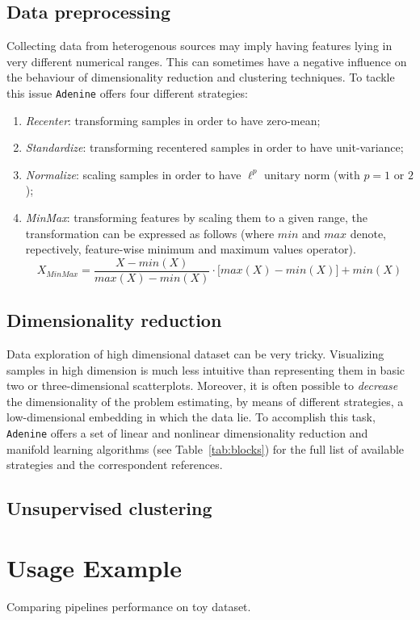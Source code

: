\documentclass[twoside,11pt]{article}
\makeatletter
\newcommand{\ade}{\texttt{Adenine}\@\xspace}
\makeatother
\begin{document}
\subsection*{Data preprocessing}
Collecting data from heterogenous sources may imply having features lying in very different numerical ranges. This can sometimes have a negative influence on the behaviour of dimensionality reduction and clustering techniques. To tackle this issue \ade offers four different strategies:
\begin{enumerate}[label=(\roman*)]
  \item \emph{Recenter}: transforming samples in order to have zero-mean;
  \item \emph{Standardize}: transforming recentered samples in order to have unit-variance;
  \item \emph{Normalize}: scaling samples in order to have $\ell^p$ unitary norm (with $p = 1$ or $2$);
  \item \emph{MinMax}: transforming features by scaling them to a given range, the transformation can be expressed as follows (where $min$ and $max$ denote, repectively, feature-wise minimum and maximum values operator).
  \[
    X_{MinMax} = \frac{X - min(X)}{max(X) - min(X)} \cdot \Big[max(X) - min(X)\Big] + min(X)
  \]
\end{enumerate}

\subsection*{Dimensionality reduction}
Data exploration of high dimensional dataset can be very tricky. Visualizing samples in high dimension is much less intuitive than representing them in basic two or three-dimensional scatterplots. Moreover, it is often possible to \emph{decrease} the dimensionality of the problem estimating, by means of different strategies, a low-dimensional embedding in which the data lie. To accomplish this task, \ade offers a set of linear and nonlinear dimensionality reduction and manifold learning algorithms (see Table~\ref{tab:blocks}) for the full list of available strategies and the correspondent references.

\subsection*{Unsupervised clustering}

\section{Usage Example}
Comparing pipelines performance on toy dataset.
\end{document}
